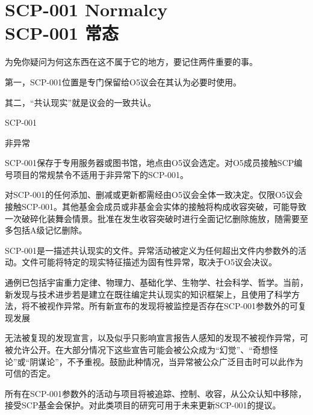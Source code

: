 \chapter[SCP-001 常态]{
    SCP-001 Normalcy\\
    SCP-001 常态
}

\label{chap:SCP-001.normalcy}

\begin{whiteboxbb}

\begin{center}


\end{center}

为免你疑问为何这东西在这不属于它的地方，要记住两件重要的事。

第一，SCP-001位置是专门保留给O5议会在其认为必要时使用。

其二，“共认现实”就是议会的一致共认。

\end{whiteboxbb}

SCP-001

非异常

SCP-001保存于专用服务器或图书馆，地点由O5议会选定。对O5成员接触SCP编号项目的常规禁令不适用于非异常下的SCP-001。

对SCP-001的任何添加、删减或更新都需经由O5议会全体一致决定。仅限O5议会接触SCP-001。其他基金会成员或非基金会实体的接触将构成收容突破，可能导致一次破碎化装舞会情景。批准在发生收容突破时进行全面记忆删除施放，随需要至多包括A级记忆删除。

SCP-001是一描述共认现实的文件。异常活动被定义为任何超出文件内参数外的活动。文件可能将特定的现实特征描述为固有性异常，取决于O5议会决议。

通例已包括宇宙重力定律、物理力、基础化学、生物学、社会科学、哲学。当前，新发现与技术进步若是建立在既往编定共认现实的知识框架上，且使用了科学方法，将不被视作异常。所有新宣布的发现将被监控是否存在SCP-001参数外的可复现发展

无法被复现的发现宣言，以及似乎只影响宣言报告人感知的发现不被视作异常，可被允许公开。在大部分情况下这些宣告可能会被公众成为“幻觉”、“奇想怪论”或“阴谋论”，不予重视。鼓励此种情况，当异常被公众广泛目击时可以此作为可信的否定。

所有在SCP-001参数外的活动与项目将被追踪、控制、收容，从公众认知中移除，接受SCP基金会保护。对此类项目的研究可用于未来更新SCP-001的提议。

\begin{center}


\end{center}

